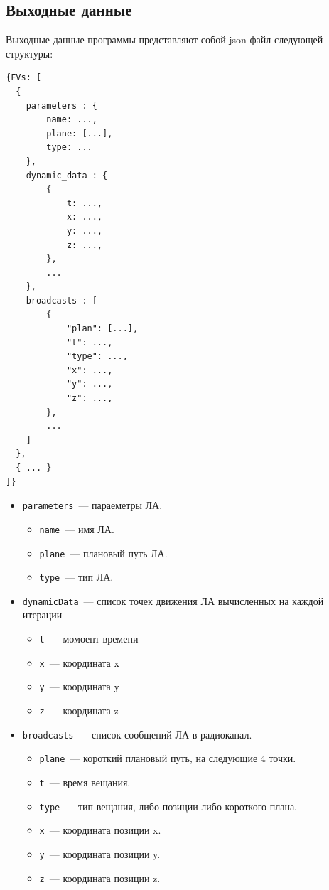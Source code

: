 \documentclass[a4paper,12pt]{article}
\begin{document}
\subsection{Выходные данные}
Выходные данные программы представляют собой json файл следующей структуры:
\begin{verbatim}
{FVs: [
  {
    parameters : { 
        name: ...,
        plane: [...],
        type: ...
    },
    dynamic_data : { 
        {
            t: ...,
            x: ...,
            y: ...,
            z: ...,
        },
        ...
    },
    broadcasts : [
        {
            "plan": [...],
            "t": ...,
            "type": ...,
            "x": ...,
            "y": ...,
            "z": ...,
        },
        ...
    ]
  },
  { ... }
]}
\end{verbatim}
\begin{itemize}
    \item \texttt{parameters}~--- параеметры ЛА.
    \begin{itemize}
            \item  \texttt{name}~--- имя ЛА.
            \item  \texttt{plane}~--- плановый путь ЛА.
            \item  \texttt{type}~--- тип ЛА.
    \end{itemize}
    \item \texttt{dynamicData}~--- список точек движения ЛА вычисленных на каждой итерации
    \begin{itemize}
            \item \texttt{t}~--- момоент времени
            \item \texttt{x}~--- координата x
            \item \texttt{y}~--- координата y
            \item\texttt{z}~--- координата z
    \end{itemize}
    \item \texttt{broadcasts}~--- список сообщений ЛА в радиоканал.
    \begin{itemize}
            \item  \texttt{plane}~--- короткий плановый путь, на следующие 4 точки.
            \item  \texttt{t}~--- время вещания.
            \item  \texttt{type}~--- тип вещания, либо позиции либо короткого плана.
            \item  \texttt{x}~--- координата позиции x.
            \item  \texttt{y}~--- координата позиции y.
            \item  \texttt{z}~--- координата позиции z.
    \end{itemize}
\end{itemize}
\end{document}
